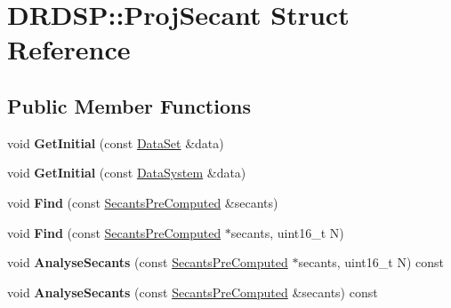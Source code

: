 \hypertarget{struct_d_r_d_s_p_1_1_proj_secant}{\section{D\-R\-D\-S\-P\-:\-:Proj\-Secant Struct Reference}
\label{struct_d_r_d_s_p_1_1_proj_secant}
}
\subsection*{Public Member Functions}
\begin{DoxyCompactItemize}
\item 
\hypertarget{struct_d_r_d_s_p_1_1_proj_secant_aaefd4fae1d6f593b4f3699f866421b2c}{void {\bfseries Get\-Initial} (const \hyperlink{struct_d_r_d_s_p_1_1_data_set}{Data\-Set} \&data)}\label{struct_d_r_d_s_p_1_1_proj_secant_aaefd4fae1d6f593b4f3699f866421b2c}

\item 
\hypertarget{struct_d_r_d_s_p_1_1_proj_secant_a9c9ff355f1c573933201b714f73063a5}{void {\bfseries Get\-Initial} (const \hyperlink{struct_d_r_d_s_p_1_1_data_system}{Data\-System} \&data)}\label{struct_d_r_d_s_p_1_1_proj_secant_a9c9ff355f1c573933201b714f73063a5}

\item 
\hypertarget{struct_d_r_d_s_p_1_1_proj_secant_a6a8623152ec81a33eba68b44b4c79690}{void {\bfseries Find} (const \hyperlink{struct_d_r_d_s_p_1_1_secants_pre_computed}{Secants\-Pre\-Computed} \&secants)}\label{struct_d_r_d_s_p_1_1_proj_secant_a6a8623152ec81a33eba68b44b4c79690}

\item 
\hypertarget{struct_d_r_d_s_p_1_1_proj_secant_a210cb136c3cdcf9ee3ea7b6bd63d2278}{void {\bfseries Find} (const \hyperlink{struct_d_r_d_s_p_1_1_secants_pre_computed}{Secants\-Pre\-Computed} $\ast$secants, uint16\-\_\-t N)}\label{struct_d_r_d_s_p_1_1_proj_secant_a210cb136c3cdcf9ee3ea7b6bd63d2278}

\item 
\hypertarget{struct_d_r_d_s_p_1_1_proj_secant_a569874599fa6c600170787c8186bea50}{void {\bfseries Analyse\-Secants} (const \hyperlink{struct_d_r_d_s_p_1_1_secants_pre_computed}{Secants\-Pre\-Computed} $\ast$secants, uint16\-\_\-t N) const }\label{struct_d_r_d_s_p_1_1_proj_secant_a569874599fa6c600170787c8186bea50}

\item 
\hypertarget{struct_d_r_d_s_p_1_1_proj_secant_a5cd887b8b69d245d986dd6715937bf18}{void {\bfseries Analyse\-Secants} (const \hyperlink{struct_d_r_d_s_p_1_1_secants_pre_computed}{Secants\-Pre\-Computed} \&secants) const }\label{struct_d_r_d_s_p_1_1_proj_secant_a5cd887b8b69d245d986dd6715937bf18}


\end{DoxyCompactItemize}
